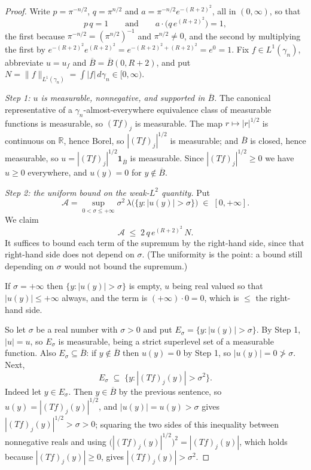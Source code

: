 \begin{proof}
Write $p = \pi^{-n/2}$, $q = \pi^{n/2}$ and $a = \pi^{-n/2}e^{-(R+2)^2}$, all in
$(0,\infty)$, so that
\begin{equation*}
  p\,q = 1 \qquad\text{and}\qquad a\cdot\bigl(q\,e^{(R+2)^2}\bigr) = 1 ,
  \tag{1}
\end{equation*}
the first because $\pi^{-n/2} = (\pi^{n/2})^{-1}$ and $\pi^{n/2} \neq 0$, and
the second by multiplying the first by
$e^{-(R+2)^2}e^{(R+2)^2} = e^{-(R+2)^2+(R+2)^2} = e^0 = 1$.  Fix
$f \in L^1(\gamma_n)$, abbreviate $u = u_f$ and $\overline B =
\overline B(0,R+2)$, and put $N = \|f\|_{L^1(\gamma_n)} = \int|f|\,d\gamma_n
\in [0,\infty)$.

\emph{Step 1: $u$ is measurable, nonnegative, and supported in
$\overline B$.}  The canonical representative of a $\gamma_n$-almost-everywhere
equivalence class of measurable functions is measurable, so $(Tf)_j$ is
measurable.  The map $r \mapsto |r|^{1/2}$ is continuous on $\mathbb{R}$, hence
Borel, so $|(Tf)_j|^{1/2}$ is measurable; and $\overline B$ is closed, hence
measurable, so $u = |(Tf)_j|^{1/2}\mathbf 1_{\overline B}$ is measurable.  Since
$|(Tf)_j|^{1/2} \geq 0$ we have $u \geq 0$ everywhere, and $u(y) = 0$ for
$y \notin \overline B$.

\emph{Step 2: the uniform bound on the weak-$L^2$ quantity.}  Put
\[
  \mathcal{A} = \sup_{0<\sigma\leq+\infty}
    \sigma^2\,\lambda\bigl(\{y : |u(y)| > \sigma\}\bigr)
  \;\in\;[0,+\infty] .
\]
We claim
\begin{equation*}
  \mathcal{A} \;\leq\; 2\,q\,e^{(R+2)^2}\,N . \tag{2}
\end{equation*}
It suffices to bound each term of the supremum by the right-hand side, since
that right-hand side does not depend on $\sigma$.  (The uniformity is the
point: a bound still depending on $\sigma$ would not bound the supremum.)

If $\sigma = +\infty$ then $\{y : |u(y)| > \sigma\}$ is empty, $u$ being real
valued so that $|u(y)| \leq +\infty$ always, and the term is
$(+\infty)\cdot 0 = 0$, which is $\leq$ the right-hand side.

So let $\sigma$ be a real number with $\sigma > 0$ and put
$E_\sigma = \{y : |u(y)| > \sigma\}$.  By Step 1, $|u| = u$, so $E_\sigma$ is
measurable, being a strict superlevel set of a measurable function.  Also
$E_\sigma \subseteq \overline B$: if $y \notin \overline B$ then $u(y) = 0$ by
Step 1, so $|u(y)| = 0 \not> \sigma$.  Next,
\begin{equation*}
  E_\sigma \;\subseteq\; \bigl\{y : |(Tf)_j(y)| > \sigma^2\bigr\} . \tag{3}
\end{equation*}
Indeed let $y \in E_\sigma$.  Then $y \in \overline B$ by the previous
sentence, so $u(y) = |(Tf)_j(y)|^{1/2}$, and $|u(y)| = u(y) > \sigma$ gives
$|(Tf)_j(y)|^{1/2} > \sigma > 0$; squaring the two sides of this inequality
between nonnegative reals and using
$\bigl(|(Tf)_j(y)|^{1/2}\bigr)^2 = |(Tf)_j(y)|$, which holds because
$|(Tf)_j(y)| \geq 0$, gives $|(Tf)_j(y)| > \sigma^2$.


\end{proof}
